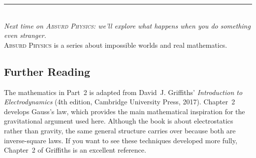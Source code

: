 \documentclass[11pt, letterpaper]{article}
\newcommand{\seriesname}{\textsc{Absurd Physics}}
\begin{document}
\vspace{1cm}
\begin{center}
\rule{0.4\textwidth}{0.5pt}\\[8pt]
{\small\textit{Next time on \seriesname: we'll explore what happens when you do something even stranger.}}\\[4pt]
{\footnotesize \seriesname{} is a series about impossible worlds and real mathematics.}
\end{center}

\vspace{1cm}

\subsection*{Further Reading}

The mathematics in Part~2 is adapted from David~J. Griffiths' \textit{Introduction to Electrodynamics} (4th edition, Cambridge University Press, 2017). Chapter~2 develops Gauss's law, which provides the main mathematical inspiration for the gravitational argument used here. Although the book is about electrostatics rather than gravity, the same general structure carries over because both are inverse-square laws. If you want to see these techniques developed more fully, Chapter~2 of Griffiths is an excellent reference.
\end{document}
